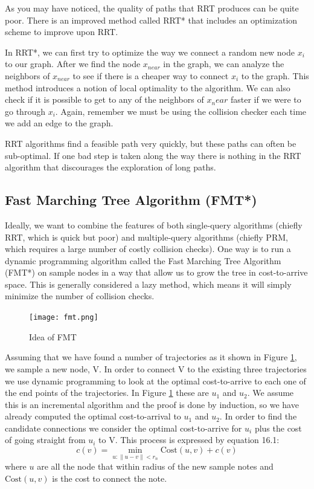 \documentclass[twoside]{article}
\begin{document}
As you may have noticed, the quality of paths that RRT produces can be quite poor. There is an improved method called RRT* that includes an optimization scheme to improve upon RRT.

In RRT*, we can first try to optimize the way we connect a random new node $x_i$ to our graph. After we find the node $x_{near}$ in the graph, we can analyze the neighbors of $x_{near}$ to see if there is a cheaper way to connect $x_i$ to the graph. This method introduces a notion of local optimality to the algorithm. We can also check if it is possible to get to any of the neighbors of $x_near$ faster if we were to go through $x_i$. Again, remember we must be using the collision checker each time we add an edge to the graph.

RRT algorithms find a feasible path very quickly, but these paths can often be sub-optimal. If one bad step is taken along the way there is nothing in the RRT algorithm that discourages the exploration of long paths.

\subsection{Fast Marching Tree Algorithm (FMT*)} %
Ideally, we want to combine the features of both single-query algorithms (chiefly RRT, which is quick but poor) and multiple-query algorithms (chiefly PRM, which requires a large number of costly collision checks). One way is to run a dynamic programming algorithm called the Fast Marching Tree Algorithm (FMT*) on sample nodes in a way that allow us to grow the tree in cost-to-arrive space. This is generally considered a lazy method, which means it will simply minimize the number of collision checks.

\begin{figure}[H]
  \centering
  \texttt{[image: fmt.png]}
  \caption{Idea of FMT}
  \label{fig:plot_idea}
\end{figure}

Assuming that we have found a number of trajectories as it shown in Figure \ref{fig:plot_idea}, we sample a new node, V. In order to connect V to the existing three trajectories we use dynamic programming to look at the optimal cost-to-arrive to each one of the end points of the trajectories. In Figure \ref{fig:plot_idea} these are $u_1$ and $u_2$. We assume this is an incremental algorithm and the proof is done by induction, so we have already computed the optimal cost-to-arrival to $u_1$ and $u_2$. In order to find the candidate connections we consider the optimal cost-to-arrive for $u_i$ plus the cost of going straight from $u_i$ to V. This process is expressed by equation 16.1:
\begin{equation}
c(v) = \min_{u:\|u - v\| < r_n} \text{Cost}(u, v) + c(v)
\end{equation}
where $u$ are all the node that within radius of the new sample notes and $\text{Cost}(u, v)$ is the cost to connect the note.
\end{document}
